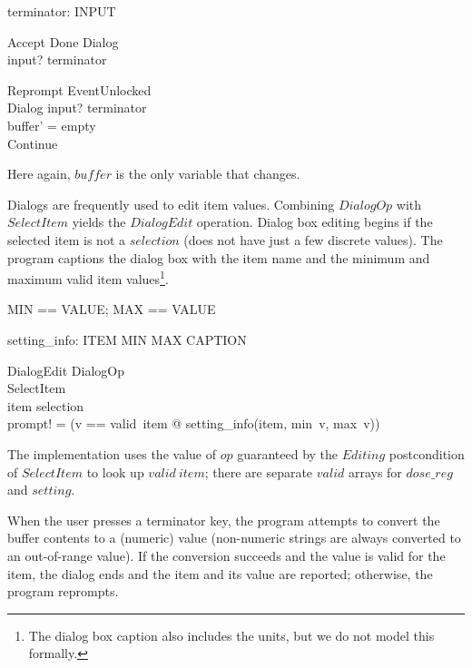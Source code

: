 \begin{axdef}
	terminator: \power INPUT
\end{axdef}

\begin{schema}{Accept}
	Done
\where
	Dialog \\
	input? \in terminator
\end{schema}

\begin{schema}{Reprompt}
	EventUnlocked \\
	\Delta Dialog
\where
	input? \in terminator \\
	buffer' = empty \\
	Continue
\end{schema}
Here again, $buffer$ is the only variable that changes.

Dialogs are frequently used to edit item values. Combining $DialogOp$
with $SelectItem$ yields the $DialogEdit$ operation.  Dialog box
editing begins if the selected item is not a $selection$ (does not
have just a few discrete values).  The program captions the dialog box
with the item name and the minimum and maximum valid item
values\footnote{The dialog box caption also includes the units, but we
do not model this formally.}.
	
\begin{zed} MIN == VALUE; MAX == VALUE \end{zed}

\begin{axdef}
	setting\_info: ITEM \cross MIN \cross MAX \fun CAPTION
\end{axdef}

\begin{schema}{DialogEdit}
	DialogOp \\
	SelectItem \\
\where
	item \notin selection \\
	prompt! = (\LET v == valid~item @ setting\_info(item, min~v, max~v))
\end{schema}
The implementation uses the value of $op$ guaranteed by the $Editing$
postcondition of $SelectItem$ to look up $valid~item$; there are
separate $valid$ arrays for $dose\_reg$ and $setting$.

When the user presses a terminator key, the program attempts to
convert the buffer contents to a (numeric) value (non-numeric strings
are always converted to an out-of-range value).  If the conversion
succeeds and the value is valid for the item, the dialog ends and the
item and its value are reported; otherwise, the program reprompts.

